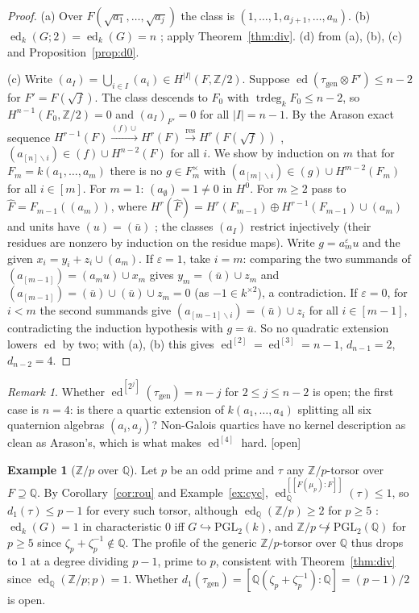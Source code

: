 \documentclass[11pt]{amsart}
\theoremstyle{definition}
\newtheorem{example}[theorem]{Example}
\theoremstyle{remark}
\newtheorem{remark}[theorem]{Remark}
\newcommand{\ed}{\operatorname{ed}}
\newcommand{\edd}[1]{\ed^{[#1]}}
\newcommand{\tr}{\operatorname{trdeg}}
\newcommand{\gen}{\mathrm{gen}}
\newcommand{\Z}{\mathbb Z}
\newcommand{\Q}{\mathbb Q}
\newcommand{\stag}[1]{\hfill{\normalfont[#1]}}
\newcommand{\res}{\operatorname{res}}
\begin{document}
\begin{proof}
(a) Over $F(\sqrt{a_1},\dots,\sqrt{a_j})$ the class is $(1,\dots,1,a_{j+1},\dots,a_n)$.
(b) $\ed_k(G;2)=\ed_k(G)=n$ \cite{BR,KM}; apply Theorem~\ref{thm:div}. (d) from (a),
(b), (c) and Proposition~\ref{prop:d0}.

(c) Write $(a_I)=\bigcup_{i\in I}(a_i)\in H^{|I|}(F,\Z/2)$. Suppose
$\ed(\tau_\gen\otimes F')\le n-2$ for $F'=F(\sqrt f)$. The class descends to $F_0$ with
$\tr_kF_0\le n-2$, so $H^{n-1}(F_0,\Z/2)=0$ \cite[II.4.2]{Se} and $(a_I)_{F'}=0$ for
all $|I|=n-1$. By the Arason exact sequence $H^{r-1}(F)\xrightarrow{(f)\cup}H^r(F)
\xrightarrow{\res}H^r(F(\sqrt f))$ \cite{Ar}, $(a_{[n]\smallsetminus i})\in(f)\cup
H^{n-2}(F)$ for all $i$. We show by induction on $m$ that for $F_m=k(a_1,\dots,a_m)$
there is no $g\in F_m^\times$ with $(a_{[m]\smallsetminus i})\in(g)\cup H^{m-2}(F_m)$
for all $i\in[m]$. For $m=1$: $(a_\emptyset)=1\ne0$ in $H^0$. For $m\ge2$ pass to
$\hat F=F_{m-1}((a_m))$, where $H^r(\hat F)=H^r(F_{m-1})\oplus H^{r-1}(F_{m-1})\cup(a_m)$
and units have $(u)=(\bar u)$ \cite[II.4.3]{Se}; the classes $(a_I)$ restrict
injectively (their residues are nonzero by induction on the residue maps). Write
$g=a_m^\varepsilon u$ and the given $x_i=y_i+z_i\cup(a_m)$. If $\varepsilon=1$, take
$i=m$: comparing the two summands of $(a_{[m-1]})=(a_mu)\cup x_m$ gives
$y_m=(\bar u)\cup z_m$ and $(a_{[m-1]})=(\bar u)\cup(\bar u)\cup z_m=0$ (as $-1\in
k^{\times2}$), a contradiction. If $\varepsilon=0$, for $i<m$ the second summands give
$(a_{[m-1]\smallsetminus i})=(\bar u)\cup z_i$ for all $i\in[m-1]$, contradicting the
induction hypothesis with $g=\bar u$. So no quadratic extension lowers $\ed$ by two;
with (a), (b) this gives $\edd2=\edd3=n-1$, $d_{n-1}=2$, $d_{n-2}=4$.
\end{proof}

\begin{remark}
Whether $\edd{2^j}(\tau_\gen)=n-j$ for $2\le j\le n-2$ is open; the first case is
$n=4$: is there a quartic extension of $k(a_1,\dots,a_4)$ splitting all six quaternion
algebras $(a_i,a_j)$? Non-Galois quartics have no kernel description as clean as
Arason's, which is what makes $\edd4$ hard. [open]
\end{remark}

\begin{example}[$\Z/p$ over $\Q$]\label{ex:Zp}
Let $p$ be an odd prime and $\tau$ any $\Z/p$-torsor over $F\supseteq\Q$. By
Corollary~\ref{cor:rou} and Example~\ref{ex:cyc}, $\edd{[F(\mu_p):F]}_\Q(\tau)\le1$,
so $d_1(\tau)\le p-1$ for every such torsor, although $\ed_\Q(\Z/p)\ge2$ for
$p\ge5$ \cite{Le07}: $\ed_k(G)=1$ in characteristic $0$ iff $G\hookrightarrow
\mathrm{PGL}_2(k)$, and $\Z/p\not\hookrightarrow\mathrm{PGL}_2(\Q)$ for $p\ge5$
since $\zeta_p+\zeta_p^{-1}\notin\Q$. The profile of the generic $\Z/p$-torsor over
$\Q$ thus drops to $1$ at a degree dividing $p-1$, prime to $p$, consistent with
Theorem~\ref{thm:div} since $\ed_\Q(\Z/p;p)=1$. Whether $d_1(\tau_\gen)=
[\Q(\zeta_p+\zeta_p^{-1}):\Q]=(p-1)/2$ is open.
\stag{proved from \cite{Le07}}
\end{example}
\end{document}
